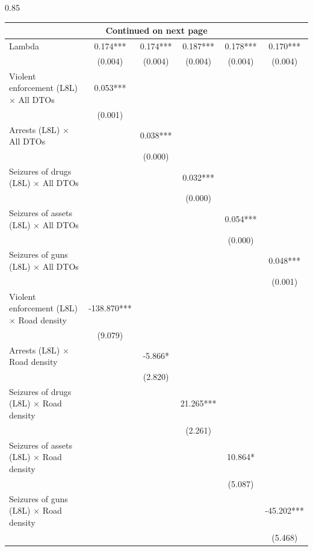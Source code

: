 \documentclass[12pt,letterpaper]{article}
\begin{document}
\begin{landscape}
\begin{center}
\begin{spacing}{0.85}
\begin{longtable}{lccccc}
\hline \multicolumn{6}{c}{{Continued on next page}} \\ \hline
\endfoot

\hline \hline
\endlastfoot
                
Lambda  & 0.174*** & 0.174*** & 0.187*** & 0.178*** & 0.170*** \\
 & (0.004)  & (0.004)  & (0.004)  & (0.004)  & (0.004)  \\
                
Violent enforcement (L8L) $\times$ All DTOs & 0.053*** &   &   &   &   \\
 & (0.001)  &   &   &   &   \\
Arrests (L8L) $\times$ All DTOs &   & 0.038*** &   &   &   \\
 &   & (0.000)  &   &   &   \\
Seizures of drugs (L8L) $\times$ All DTOs &   &   & 0.032*** &   &   \\
 &   &   & (0.000)  &   &   \\
Seizures of assets (L8L) $\times$ All DTOs &   &   &   & 0.054*** &   \\
 &   &   &   & (0.000)  &   \\
Seizures of guns (L8L) $\times$ All DTOs &   &   &   &   & 0.048*** \\
 &   &   &   &   & (0.001)  \\

Violent enforcement (L8L) $\times$ Road density & -138.870*** &   &   &   &   \\
 & (9.079)  &   &   &   &   \\
Arrests (L8L) $\times$ Road density &   & -5.866* &   &   &   \\
 &   & (2.820)  &   &   &   \\
Seizures of drugs (L8L) $\times$ Road density &   &   & 21.265*** &   &   \\
 &   &   & (2.261)  &   &   \\
Seizures of assets (L8L) $\times$ Road density &   &   &   & 10.864* &   \\
 &   &   &   & (5.087)  &   \\
Seizures of guns (L8L) $\times$ Road density &   &   &   &   & -45.202*** \\
 &   &   &   &   & (5.468)  \\
                

\end{longtable}
\end{spacing}
\end{center}
\end{landscape}
\end{document}
